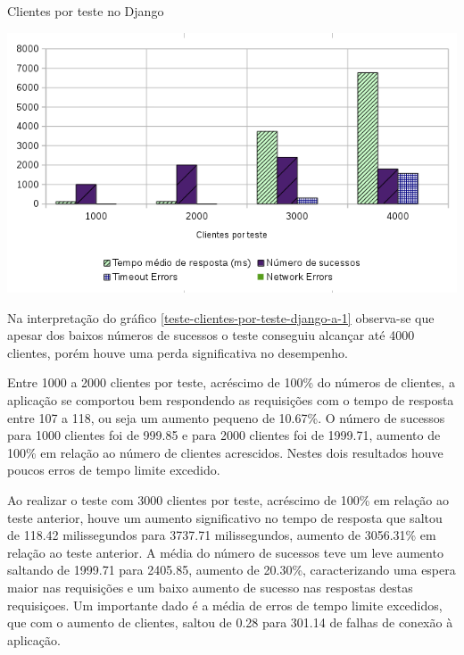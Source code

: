   \begin{grafico}[H]
    \setlength{\abovecaptionskip}{5pt}
    \setlength{\belowcaptionskip}{0pt}
    
    \caption[Clientes por teste no Django]
	    {Clientes por teste no Django}
    \centering
    \includegraphics[width=.80\textwidth]{imagem/graficos/grafico_django_plano_de_teste_1.png}
    \captionsetup[grafico]{justification=centering}
    \label{teste-clientes-por-teste-django-a-1}
  \end{grafico}

  Na interpretação do gráfico \ref{teste-clientes-por-teste-django-a-1}  observa-se que apesar dos baixos números de sucessos o teste
  conseguiu alcançar até 4000 clientes, porém houve uma perda significativa no desempenho.

  Entre 1000 a 2000 clientes por teste, acréscimo de 100\% do números de clientes, a aplicação se comportou bem respondendo as requisições com o tempo de resposta entre
  107 a 118, ou seja um aumento pequeno de 10.67\%. O número de sucessos para 1000 clientes foi de 999.85 e para 2000 clientes foi de 1999.71, aumento
  de 100\% em relação ao número de clientes acrescidos. Nestes dois resultados houve poucos erros de tempo limite excedido.

  Ao realizar o teste com 3000 clientes por teste, acréscimo de 100\% em relação ao teste anterior, houve um aumento significativo no tempo de resposta
  que saltou de 118.42 milissegundos para 3737.71 milissegundos, aumento de  3056.31\% em relação ao teste anterior. A média do número de sucessos
  teve um leve aumento saltando de 1999.71 para 2405.85, aumento de 20.30\%, caracterizando uma espera maior nas requisições e um baixo aumento
  de sucesso nas respostas destas requisiçoes. Um importante dado é a média de erros de tempo limite excedidos, que com o aumento de clientes,
  saltou de 0.28 para 301.14 de falhas de conexão à aplicação.

